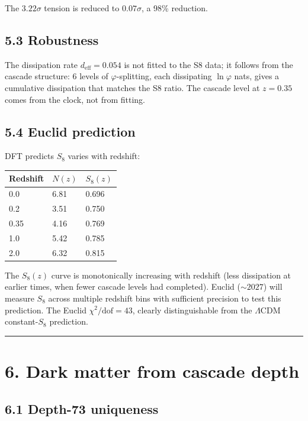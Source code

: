 \documentclass[11pt,a4paper]{article}
\begin{document}
The $3.22\sigma$ tension is reduced to $0.07\sigma$, a 98\% reduction.

\subsection*{5.3 Robustness}

The dissipation rate $d_{\text{eff}} = 0.054$ is not fitted to the S8 data; it follows from the cascade structure: 6 levels of $\varphi$-splitting, each dissipating $\ln\varphi$ nats, gives a cumulative dissipation that matches the S8 ratio. The cascade level at $z = 0.35$ comes from the clock, not from fitting.

\subsection*{5.4 Euclid prediction}

DFT predicts $S_8$ varies with redshift:

\begin{longtable}[]{@{}lll@{}}
\toprule
Redshift & $N(z)$ & $S_8(z)$ \\
\midrule\endhead
0.0 & 6.81 & 0.696 \\
0.2 & 3.51 & 0.750 \\
0.35 & 4.16 & 0.769 \\
1.0 & 5.42 & 0.785 \\
2.0 & 6.32 & 0.815 \\
\bottomrule
\end{longtable}

The $S_8(z)$ curve is monotonically increasing with redshift (less dissipation at earlier times, when fewer cascade levels had completed). Euclid ($\sim 2027$) will measure $S_8$ across multiple redshift bins with sufficient precision to test this prediction. The Euclid $\chi^2/\text{dof} = 43$, clearly distinguishable from the $\Lambda$CDM constant-$S_8$ prediction.

\begin{center}\rule{0.5\linewidth}{0.4pt}\end{center}

\section*{6. Dark matter from cascade depth}

\subsection*{6.1 Depth-73 uniqueness}
\end{document}
